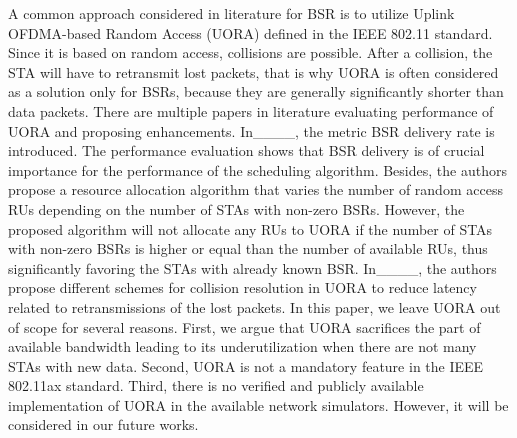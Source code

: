 A common approach considered in literature for BSR is to utilize Uplink
OFDMA-based Random Access (UORA) defined in the IEEE 802.11 standard.
Since it is based on random access, collisions are possible. After a collision,
the STA will have to retransmit lost packets, that is why UORA is often
considered as a solution only for BSRs, because they are generally significantly
shorter than data packets. There are multiple papers in literature evaluating
performance of UORA and proposing enhancements. In____, the metric BSR delivery rate is introduced.
The performance evaluation shows that BSR delivery is of crucial importance for
the performance of the scheduling algorithm. Besides, the authors propose a resource
allocation algorithm that varies the number of random access RUs depending on
the number of STAs with non-zero BSRs. However, the proposed algorithm will not
allocate any RUs to UORA if the number of STAs with non-zero BSRs is higher or
equal than the number of available RUs, thus significantly favoring the STAs
with already known BSR. In____, the authors
propose different schemes for collision resolution in UORA to reduce latency
related to retransmissions of the lost packets. In this paper, we leave UORA out
of scope for several reasons. First, we argue that UORA sacrifices the part of
available bandwidth leading to its underutilization when there are not many
STAs with new data. Second, UORA is not a mandatory feature in the IEEE 802.11ax
standard. Third, there is no verified and publicly available implementation of
UORA in the available network simulators. However, it will be considered in our
future works.

